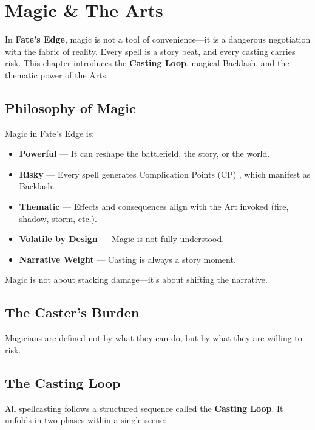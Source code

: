 
\chapter{Magic \& The Arts}
\label{ch:magic}

In \textbf{Fate's Edge}, magic is not a tool of convenience—it is a dangerous negotiation with the fabric of reality. Every spell is a story beat, and every casting carries risk. This chapter introduces the \textbf{Casting Loop}, magical Backlash, and the thematic power of the Arts.

\section{Philosophy of Magic}

Magic in Fate's Edge is:

\begin{itemize}
  \item \textbf{Powerful} — It can reshape the battlefield, the story, or the world.
  \item \textbf{Risky} — Every spell generates Complication Points (CP) , which manifest as Backlash.
  \item \textbf{Thematic} — Effects and consequences align with the Art invoked (fire, shadow, storm, etc.).
  \item \textbf{Volatile by Design} — Magic is not fully understood.
  \item \textbf{Narrative Weight} — Casting is always a story moment.
\end{itemize}

Magic is not about stacking damage—it's about shifting the narrative.

\section{The Caster's Burden}

Magicians are defined not by what they can do, but by what they are willing to risk.

\section{The Casting Loop}

All spellcasting follows a structured sequence called the \textbf{Casting Loop}. It unfolds in two phases within a single scene:

